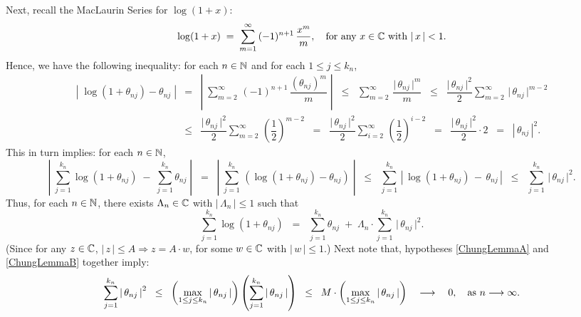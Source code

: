 Next, recall the MacLaurin Series for $\log(1+x)$:
\begin{equation*}
\log(1+x) \;=\; \sum_{m=1}^{\infty}\,(-1)^{n+1}\,\dfrac{x^{m}}{m},
\quad
\textnormal{for any $x \in \mathbb{C}$ with $\vert\,x\,\vert < 1$}. 
\end{equation*}
Hence, we have the following inequality: for each $n \in \mathbb{N}$ and for each $1 \leq j \leq k_{n}$,
\begin{eqnarray*}
\left\vert\; \log(1 + \theta_{nj}) - \theta_{nj} \;\right\vert
&=& \left\vert\; \sum_{m=2}^{\infty}\,(-1)^{n+1}\,\dfrac{(\theta_{nj})^{m}}{m} \;\right\vert
\;\;\leq\;\; \sum_{m=2}^{\infty}\,\dfrac{\vert\,\theta_{nj}\,\vert^{m}}{m}
\;\;\leq\;\; \dfrac{\vert\,\theta_{nj}\,\vert^{2}}{2}\sum_{m=2}^{\infty}\,\vert\,\theta_{nj}\,\vert^{m-2}
\\
&\leq& \dfrac{\vert\,\theta_{nj}\,\vert^{2}}{2}\sum_{m=2}^{\infty}\,\left(\dfrac{1}{2}\right)^{m-2}
\;\;=\;\; \dfrac{\vert\,\theta_{nj}\,\vert^{2}}{2}\sum_{i=2}^{\infty}\,\left(\dfrac{1}{2}\right)^{i-2}
\;\;=\;\; \dfrac{\vert\,\theta_{nj}\,\vert^{2}}{2} \cdot 2
\;\;=\;\; \left\vert\,\theta_{nj}\,\right\vert^{2}.
\end{eqnarray*}
This in turn implies: for each $n \in \mathbb{N}$,
\begin{equation*}
\left\vert\; \sum_{j=1}^{k_{n}}\log(1 + \theta_{nj}) \; - \; \sum_{j=1}^{k_{n}}\theta_{nj} \;\right\vert
\;\;=\;\; \left\vert\; \sum_{j=1}^{k_{n}}\,\left(\log(1+\theta_{nj}) - \theta_{nj}\right) \;\right\vert
\;\;\leq\;\; \sum_{j=1}^{k_{n}}\,\left\vert\,\log(1+\theta_{nj}) \, - \, \theta_{nj} \,\right\vert
\;\;\leq\;\; \sum_{j=1}^{k_{n}}\,\vert\,\theta_{nj}\,\vert^{2}.
\end{equation*}
Thus, for each $n \in \mathbb{N}$, there exists $\Lambda_{n} \in \mathbb{C}$ with $\left\vert\,\Lambda_{n}\,\right\vert \leq 1$ such that
\begin{equation*}
\sum_{j=1}^{k_{n}}\log(1 + \theta_{nj})
\;\; = \;\; \sum_{j=1}^{k_{n}}\theta_{nj} \;+\; \Lambda_{n}\cdot\sum_{j=1}^{k_{n}}\,\vert\,\theta_{nj}\,\vert^{2}.
\end{equation*}
(Since for any $z \in \mathbb{C}$, $\left\vert\,z\,\right\vert \leq A$\;\;$\Longrightarrow$\;\;$z = A\cdot w$,
for some $w\in\mathbb{C}$ with $\vert\,w\,\vert \leq 1$.)
Next note that, hypotheses \eqref{ChungLemmaA} and \eqref{ChungLemmaB} together imply:
\begin{equation*}
\sum_{j=1}^{k_{n}}\left\vert\,\theta_{nj}\,\right\vert^{2}
\;\;\leq\;\; \left(\max_{1\leq j \leq k_{n}}\left\vert\,\theta_{nj}\,\right\vert\right)\left(\sum_{j=1}^{k_{n}}\left\vert\,\theta_{nj}\,\right\vert\right) 
\;\;\leq\;\; M\cdot\left(\max_{1\leq j \leq k_{n}}\left\vert\,\theta_{nj}\,\right\vert\right)
\quad\longrightarrow\quad 0,
\quad\textnormal{as $n \longrightarrow \infty$.}
\end{equation*}
